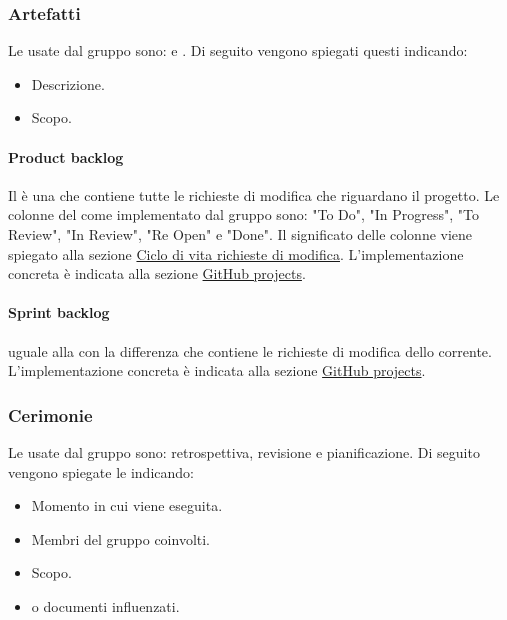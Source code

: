 \subsubsection{Artefatti}
Le  usate dal gruppo sono:  e . 
Di seguito vengono spiegati questi  indicando:
\begin{itemize}
    \item Descrizione.
    \item Scopo.
\end{itemize}

\paragraph{Product backlog}
Il  è una  che contiene tutte le richieste di modifica che riguardano il progetto.
Le colonne del  come implementato dal gruppo sono: "To Do", "In Progress", "To Review", "In Review", "Re Open" e "Done".
Il significato delle colonne viene spiegato alla sezione \hyperref[par:ciclo_vita_richieste_di_modifica]{Ciclo di vita richieste di modifica}.
L'implementazione concreta è indicata alla sezione \hyperref[subpar:project]{GitHub projects}.

\paragraph{Sprint backlog}
 uguale alla  con la differenza che contiene le richieste di modifica dello  corrente.
L'implementazione concreta è indicata alla sezione \hyperref[subpar:project]{GitHub projects}.

\subsubsection{Cerimonie}
Le  usate dal gruppo sono: retrospettiva, revisione e pianificazione. 
Di seguito vengono spiegate le  indicando:
\begin{itemize}
    \item Momento in cui viene eseguita.
    \item Membri del gruppo coinvolti.
    \item Scopo.
    \item {} o documenti influenzati.
\end{itemize}

